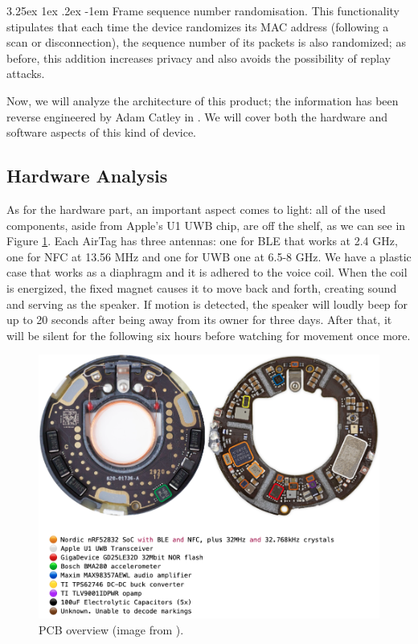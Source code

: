 \documentclass[english]{article}
\makeatletter
\renewcommand\paragraph{\@startsection{paragraph}{5}{\z@}%
  {3.25ex \@plus1ex \@minus.2ex}%
  {-1em}%
  {\normalfont\normalsize\bfseries}}
\makeatother
\begin{document}
\paragraph{Frame sequence number randomisation.}
This functionality stipulates that each time the device randomizes its MAC address (following a scan or disconnection), the sequence number of its packets is also randomized; as before, this addition increases privacy and also avoids the possibility of replay attacks.

Now, we will analyze the architecture of this product; the information has been reverse engineered by Adam Catley in \cite{reverse}. We will cover both the hardware and software aspects of this kind of device.

\subsection{Hardware Analysis}\label{hw}
As for the hardware part, an important aspect comes to light: all of the used components, aside from Apple's U1 UWB chip, are off the shelf, as we can see in Figure \ref{img:pcb}.
Each AirTag has three antennas: one for BLE that works at 2.4 GHz, one for NFC at 13.56 MHz and one for UWB one at 6.5-8 GHz.
We have a plastic case that works as a diaphragm and it is adhered to the voice coil. When the coil is energized, the fixed magnet causes it to move back and forth, creating sound and serving as the speaker.
If motion is detected, the speaker will loudly beep for up to 20 seconds after being away from its owner for three days. After that, it will be silent for the following six hours before watching for movement once more.
\begin{figure}[ht]
	\centering
	\includegraphics[width=\textwidth]{images/pcb.png}
	\caption{PCB overview (image from \cite{reverse}). }
	\label{img:pcb}
\end{figure}
\end{document}
